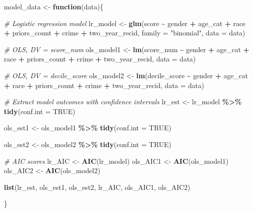 \documentclass[
]{book}
\newenvironment{Shaded}{\begin{snugshade}}{\end{snugshade}}
\newcommand{\CommentTok}[1]{\textcolor[rgb]{0.56,0.35,0.01}{\textit{#1}}}
\newcommand{\ControlFlowTok}[1]{\textcolor[rgb]{0.13,0.29,0.53}{\textbf{#1}}}
\newcommand{\DataTypeTok}[1]{\textcolor[rgb]{0.13,0.29,0.53}{#1}}
\newcommand{\KeywordTok}[1]{\textcolor[rgb]{0.13,0.29,0.53}{\textbf{#1}}}
\newcommand{\NormalTok}[1]{#1}
\newcommand{\OperatorTok}[1]{\textcolor[rgb]{0.81,0.36,0.00}{\textbf{#1}}}
\newcommand{\OtherTok}[1]{\textcolor[rgb]{0.56,0.35,0.01}{#1}}
\newcommand{\StringTok}[1]{\textcolor[rgb]{0.31,0.60,0.02}{#1}}
\begin{document}
\begin{Shaded}
\begin{Highlighting}[]
\NormalTok{model\_data \textless{}{-}}\StringTok{ }\ControlFlowTok{function}\NormalTok{(data)\{}

\CommentTok{\# Logistic regression model}
\NormalTok{lr\_model \textless{}{-}}\StringTok{ }\KeywordTok{glm}\NormalTok{(score }\OperatorTok{\textasciitilde{}}\StringTok{ }\NormalTok{gender }\OperatorTok{+}\StringTok{ }\NormalTok{age\_cat }\OperatorTok{+}\StringTok{ }\NormalTok{race }\OperatorTok{+}\StringTok{ }\NormalTok{priors\_count }\OperatorTok{+}\StringTok{ }\NormalTok{crime }\OperatorTok{+}\StringTok{ }\NormalTok{two\_year\_recid, }
             \DataTypeTok{family =} \StringTok{"binomial"}\NormalTok{, }\DataTypeTok{data =}\NormalTok{ data)}

\CommentTok{\# OLS, DV = score\_num}
\NormalTok{ols\_model1 \textless{}{-}}\StringTok{ }\KeywordTok{lm}\NormalTok{(score\_num }\OperatorTok{\textasciitilde{}}\StringTok{ }\NormalTok{gender }\OperatorTok{+}\StringTok{ }\NormalTok{age\_cat }\OperatorTok{+}\StringTok{ }\NormalTok{race }\OperatorTok{+}\StringTok{ }\NormalTok{priors\_count }\OperatorTok{+}\StringTok{ }\NormalTok{crime }\OperatorTok{+}\StringTok{ }\NormalTok{two\_year\_recid, }\DataTypeTok{data =}\NormalTok{ data)}

\CommentTok{\# OLS, DV = decile\_score }
\NormalTok{ols\_model2 \textless{}{-}}\StringTok{ }\KeywordTok{lm}\NormalTok{(decile\_score }\OperatorTok{\textasciitilde{}}\StringTok{ }\NormalTok{gender }\OperatorTok{+}\StringTok{ }\NormalTok{age\_cat }\OperatorTok{+}\StringTok{ }\NormalTok{race }\OperatorTok{+}\StringTok{ }\NormalTok{priors\_count }\OperatorTok{+}\StringTok{ }\NormalTok{crime }\OperatorTok{+}\StringTok{ }\NormalTok{two\_year\_recid, }\DataTypeTok{data =}\NormalTok{ data)}

\CommentTok{\# Extract model outcomes with confidence intervals }
\NormalTok{lr\_est \textless{}{-}}\StringTok{ }\NormalTok{lr\_model }\OperatorTok{\%\textgreater{}\%}\StringTok{ }
\StringTok{    }\KeywordTok{tidy}\NormalTok{(}\DataTypeTok{conf.int =} \OtherTok{TRUE}\NormalTok{) }

\NormalTok{ols\_est1 \textless{}{-}}\StringTok{ }\NormalTok{ols\_model1 }\OperatorTok{\%\textgreater{}\%}
\StringTok{    }\KeywordTok{tidy}\NormalTok{(}\DataTypeTok{conf.int =} \OtherTok{TRUE}\NormalTok{) }

\NormalTok{ols\_est2 \textless{}{-}}\StringTok{ }\NormalTok{ols\_model2 }\OperatorTok{\%\textgreater{}\%}
\StringTok{    }\KeywordTok{tidy}\NormalTok{(}\DataTypeTok{conf.int =} \OtherTok{TRUE}\NormalTok{) }

\CommentTok{\# AIC scores }
\NormalTok{lr\_AIC \textless{}{-}}\StringTok{ }\KeywordTok{AIC}\NormalTok{(lr\_model)}
\NormalTok{ols\_AIC1 \textless{}{-}}\StringTok{ }\KeywordTok{AIC}\NormalTok{(ols\_model1)}
\NormalTok{ols\_AIC2 \textless{}{-}}\StringTok{ }\KeywordTok{AIC}\NormalTok{(ols\_model2)}
    
\KeywordTok{list}\NormalTok{(lr\_est, ols\_est1, ols\_est2, }
\NormalTok{     lr\_AIC, ols\_AIC1, ols\_AIC2)}

\NormalTok{\}}
\end{Highlighting}
\end{Shaded}
\end{document}
